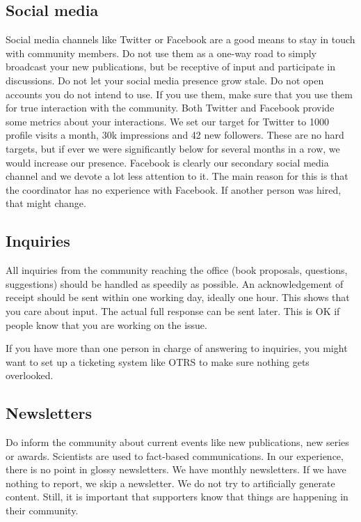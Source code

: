 \documentclass[nonflat,modfonts,output=book] {langsci/langscibook}
\begin{document}
\subsection{Social media}
Social media channels like Twitter or Facebook are a good means to stay in touch with community members. Do not use them as a one-way road to simply broadcast your new publications, but be receptive of input and participate in discussions. Do not let your social media presence grow stale. Do not open accounts you do not intend to use. If you use them, make sure that you use them for true interaction with the community. Both Twitter and Facebook provide some metrics about your interactions. We set our target for Twitter to 1000 profile visits a month, 30k impressions and 42 new followers. These are no hard targets, but if ever we were significantly below for several months in a row, we would increase our presence. 
Facebook is clearly our secondary social media channel and we devote a lot less attention to it. The main reason for this is that the coordinator has no experience with Facebook. If another person was hired, that might change. 

\subsection{Inquiries}
All inquiries from the community reaching the office (book proposals, questions, suggestions) should be handled as speedily as possible. An acknowledgement of receipt should be sent within one working day, ideally one hour. This shows that you care about input. The actual full response can be sent later. This is OK if people know that you are working on the issue.


If you have more than one person in charge of answering to inquiries, you might want to set up a ticketing system like OTRS to make sure nothing gets overlooked. 

\subsection{Newsletters}
Do inform the community about current events like new publications, new series or awards. Scientists are used to fact-based communications. In our experience, there is no point in glossy newsletters. We have monthly newsletters. If we have nothing to report, we skip a newsletter. We do not try to artificially generate content. Still, it is important that supporters know that things are happening in their community.
\end{document}
